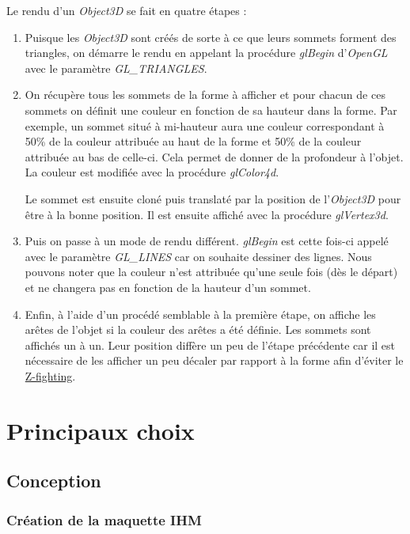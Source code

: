 \documentclass[11pt]{report}
\begin{document}
Le rendu d'un \textit{Object3D} se fait en quatre étapes :
\begin{enumerate}
    \item Puisque les \textit{Object3D} sont créés de sorte à ce que leurs sommets forment des triangles, on démarre le rendu en appelant la procédure \textit{glBegin} d'\textit{OpenGL} avec le paramètre \textit{GL\_TRIANGLES}.

    \item On récupère tous les sommets de la forme à afficher et pour chacun de ces sommets on définit une couleur en fonction de sa hauteur dans la forme. Par exemple, un sommet situé à mi-hauteur aura une couleur correspondant à 50\% de la couleur attribuée au haut de la forme et 50\% de la couleur attribuée au bas de celle-ci. Cela permet de donner de la profondeur à l'objet. La couleur est modifiée avec la procédure \textit{glColor4d}.

    Le sommet est ensuite cloné puis translaté par la position de l'\textit{Object3D} pour être à la bonne position. Il est ensuite affiché avec la procédure \textit{glVertex3d}.

    \item Puis on passe à un mode de rendu différent. \textit{glBegin} est cette fois-ci appelé avec le paramètre \textit{GL\_LINES} car on souhaite dessiner des lignes. Nous pouvons noter que la couleur n'est attribuée qu'une seule fois (dès le départ) et ne changera pas en fonction de la hauteur d'un sommet.
    \item Enfin, à l'aide d'un procédé semblable à la première étape, on affiche les arêtes de l'objet si la couleur des arêtes a été définie. Les sommets sont affichés un à un. Leur position diffère un peu de l'étape précédente car il est nécessaire de les afficher un peu décaler par rapport à la forme afin d'éviter le \href{https://www.google.com/search?q=z-fighting&oq=z-f&aqs=chrome.2.69i57j0l2j46i175i199j0l6.2593j0j4&sourceid=chrome&ie=UTF-8}{\color{blue}Z-fighting}.
\end{enumerate}

\chapter{Principaux choix}

\section{Conception}

\subsection{Création de la maquette IHM}
\end{document}
